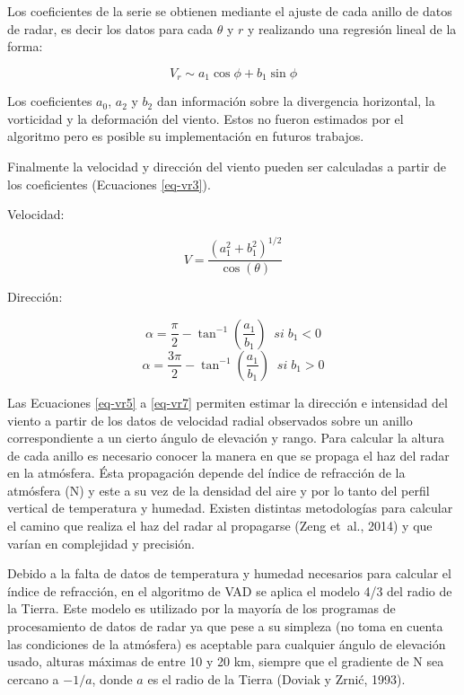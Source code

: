 \documentclass[12pt,spanish,oneside, a4paper]{book}
\begin{document}
Los coeficientes de la serie se obtienen mediante el ajuste de cada
anillo de datos de radar, es decir los datos para cada \(\theta\) y
\(r\) y realizando una regresión lineal de la forma:

\begin{equation}
\label{eq-vr4}
V_r \sim a_1\cos \phi + b_1 \sin \phi
\end{equation}

Los coeficientes \(a_0\), \(a_2\) y \(b_2\) dan información sobre la
divergencia horizontal, la vorticidad y la deformación del viento. Estos
no fueron estimados por el algoritmo pero es posible su implementación
en futuros trabajos.

Finalmente la velocidad y dirección del viento pueden ser calculadas a
partir de los coeficientes (Ecuaciones \ref{eq-vr3}).

Velocidad:

\begin{equation}
\label{eq-vr5}
V = \frac{(a_{1}^{2} + b_{1}^{2})^{1/2}}{\cos(\theta)}
\end{equation}

Dirección:

\begin{equation}\label{eq-vr6}
\alpha = \frac{\pi}{2}-\tan^{-1}(\frac{a_1}{b_1}) \; \; si \; b_1 < 0 
\end{equation}\begin{equation}\label{eq-vr7}
\alpha = \frac{3\pi}{2}-\tan^{-1}(\frac{a_1}{b_1}) \; \; si \; b_1 > 0
\end{equation}

Las Ecuaciones \ref{eq-vr5} a \ref{eq-vr7} permiten estimar la dirección
e intensidad del viento a partir de los datos de velocidad radial
observados sobre un anillo correspondiente a un cierto ángulo de
elevación y rango. Para calcular la altura de cada anillo es necesario
conocer la manera en que se propaga el haz del radar en la atmósfera.
Ésta propagación depende del índice de refracción de la atmósfera (N) y
este a su vez de la densidad del aire y por lo tanto del perfil vertical
de temperatura y humedad. Existen distintas metodologías para calcular
el camino que realiza el haz del radar al propagarse (Zeng et~al., 2014)
y que varían en complejidad y precisión.

Debido a la falta de datos de temperatura y humedad necesarios para
calcular el índice de refracción, en el algoritmo de VAD se aplica el
modelo 4/3 del radio de la Tierra. Este modelo es utilizado por la
mayoría de los programas de procesamiento de datos de radar ya que pese
a su simpleza (no toma en cuenta las condiciones de la atmósfera) es
aceptable para cualquier ángulo de elevación usado, alturas máximas de
entre 10 y 20 km, siempre que el gradiente de N sea cercano a \(-1/a\),
donde \(a\) es el radio de la Tierra (Doviak y Zrnić, 1993).
\end{document}
